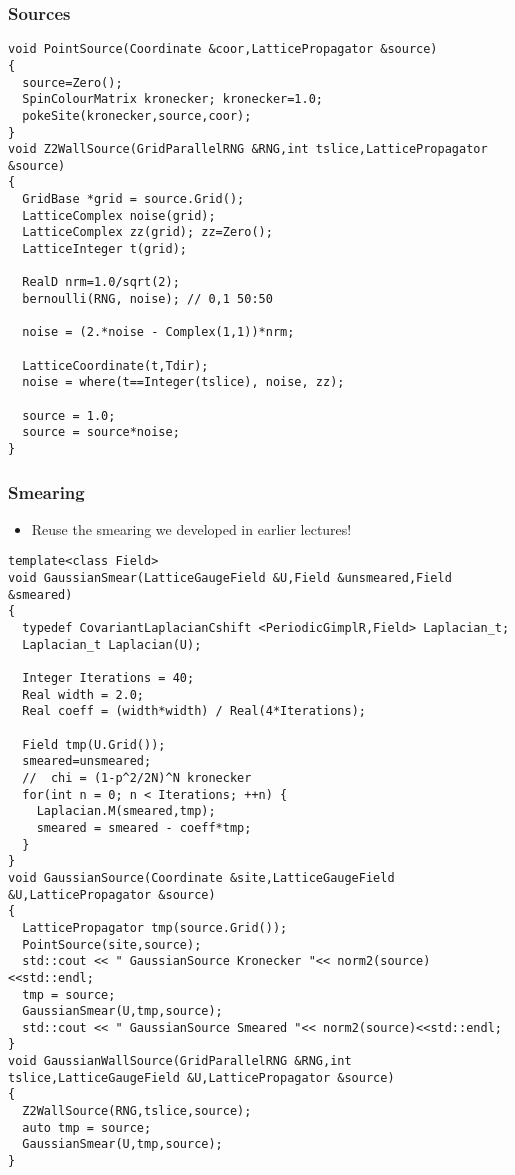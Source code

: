 \documentclass[pdf,ps,8pt]{beamer}
\begin{document}
\begin{frame}[fragile]\small\frametitle{ Sources  }

{\tiny
\begin{verbatim}
void PointSource(Coordinate &coor,LatticePropagator &source)
{
  source=Zero();
  SpinColourMatrix kronecker; kronecker=1.0;
  pokeSite(kronecker,source,coor);
}
void Z2WallSource(GridParallelRNG &RNG,int tslice,LatticePropagator &source)
{
  GridBase *grid = source.Grid();
  LatticeComplex noise(grid);
  LatticeComplex zz(grid); zz=Zero();
  LatticeInteger t(grid);

  RealD nrm=1.0/sqrt(2);
  bernoulli(RNG, noise); // 0,1 50:50

  noise = (2.*noise - Complex(1,1))*nrm;

  LatticeCoordinate(t,Tdir);
  noise = where(t==Integer(tslice), noise, zz);

  source = 1.0;
  source = source*noise;
}
\end{verbatim}
}  

\end{frame}


\begin{frame}[fragile]\small\frametitle{ Smearing }
  \begin{itemize}
    \item Reuse the smearing we developed in earlier lectures!
  \end{itemize}

{\tiny
\begin{verbatim}
template<class Field>
void GaussianSmear(LatticeGaugeField &U,Field &unsmeared,Field &smeared)
{
  typedef CovariantLaplacianCshift <PeriodicGimplR,Field> Laplacian_t;
  Laplacian_t Laplacian(U);

  Integer Iterations = 40;
  Real width = 2.0;
  Real coeff = (width*width) / Real(4*Iterations);

  Field tmp(U.Grid());
  smeared=unsmeared;
  //  chi = (1-p^2/2N)^N kronecker
  for(int n = 0; n < Iterations; ++n) {
    Laplacian.M(smeared,tmp);
    smeared = smeared - coeff*tmp;
  }
}
void GaussianSource(Coordinate &site,LatticeGaugeField &U,LatticePropagator &source)
{
  LatticePropagator tmp(source.Grid());
  PointSource(site,source);
  std::cout << " GaussianSource Kronecker "<< norm2(source)<<std::endl;
  tmp = source;
  GaussianSmear(U,tmp,source);
  std::cout << " GaussianSource Smeared "<< norm2(source)<<std::endl;
}
void GaussianWallSource(GridParallelRNG &RNG,int tslice,LatticeGaugeField &U,LatticePropagator &source)
{
  Z2WallSource(RNG,tslice,source);
  auto tmp = source;
  GaussianSmear(U,tmp,source);
}
\end{verbatim}
}  
\end{frame}
\end{document}
